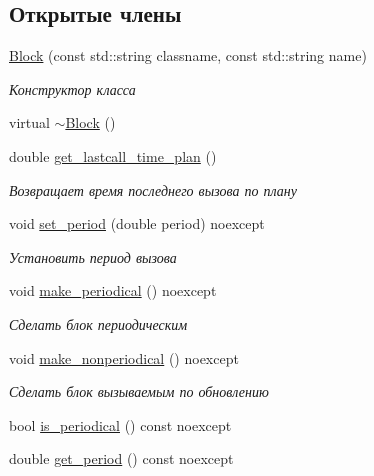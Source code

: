 \subsection*{Открытые члены}
\begin{DoxyCompactItemize}
\item 
\hyperlink{classLIBKMS__namespace_1_1Block_ab5d70866215bcf83e1351b3b87f6faa8}{Block} (const std\-::string classname, const std\-::string name)
\begin{DoxyCompactList}\small\item\em Конструктор класса \end{DoxyCompactList}\item 
virtual \hyperlink{classLIBKMS__namespace_1_1Block_a5a14faabdb3b2d924f8686a3a4f18967}{$\sim$\-Block} ()
\item 
double \hyperlink{classLIBKMS__namespace_1_1Block_a5ab9ab41a6f1e64bb0c2d1e5c43b72db}{get\-\_\-lastcall\-\_\-time\-\_\-plan} ()
\begin{DoxyCompactList}\small\item\em Возвращает время последнего вызова по плану \end{DoxyCompactList}\item 
void \hyperlink{classLIBKMS__namespace_1_1Block_a69d14e60cbcdd128a7a8349bcd04df20}{set\-\_\-period} (double period) noexcept
\begin{DoxyCompactList}\small\item\em Установить период вызова \end{DoxyCompactList}\item 
void \hyperlink{classLIBKMS__namespace_1_1Block_aa40076dc7823a49c1d9b3a674982621d}{make\-\_\-periodical} () noexcept
\begin{DoxyCompactList}\small\item\em Сделать блок периодическим \end{DoxyCompactList}\item 
void \hyperlink{classLIBKMS__namespace_1_1Block_a12d13e5d8452da4ac44028deb0e5de83}{make\-\_\-nonperiodical} () noexcept
\begin{DoxyCompactList}\small\item\em Сделать блок вызываемым по обновлению \end{DoxyCompactList}\item 
bool \hyperlink{classLIBKMS__namespace_1_1Block_a60f4040e8c8d04493ca228bca478b3f8}{is\-\_\-periodical} () const noexcept
\item 
double \hyperlink{classLIBKMS__namespace_1_1Block_a7aebfd8f059a5e29eb9fa680b7de3adb}{get\-\_\-period} () const noexcept

\end{DoxyCompactItemize}
